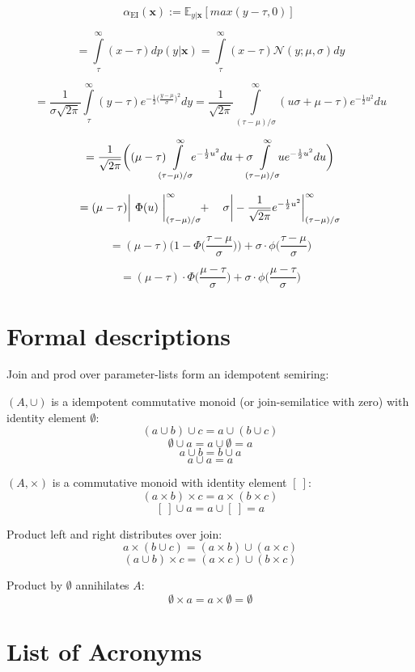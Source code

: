 \documentclass[english]{article}
\newcommand{\EI}{\operatorname{EI}}
\newcommand{\x}{\mathbf{x}}
\begin{document}
$$\alpha_{\EI}(\x) := \mathbb{E}_{y|\x}[max(y-\tau, 0)]\ $$

$$= \int\limits_{\tau}^{\infty}(x-\tau)dp(y|\x) = \int\limits_{\tau}^{\infty}(x-\tau)\mathcal{N}(y;\mu,\sigma)dy$$

$$ = \frac{1}{\sigma\sqrt{2\pi}} \int\limits_{\tau}^{\infty}(y-\tau)e^{-\frac{1}{2}\big(\frac{y-\mu}{\sigma}\big)^2}dy =
\frac{1}{\sqrt{2\pi}} \int\limits_{(\tau-\mu)/\sigma}^{\infty}(u\sigma+\mu-\tau)e^{-\frac{1}{2}u^2}du$$

$$=\frac{1}{\sqrt{2\pi}}\bigg((\mu-\tau) \mkern-12mu \int\limits_{(\tau-\mu)/\sigma}^{\infty} \mkern-10mu e^{-\frac{1}{2}u^2}du + \sigma \mkern-12mu \int\limits_{(\tau-\mu)/\sigma}^{\infty} \mkern-10mu u e^{-\frac{1}{2}u^2}du \bigg)$$

$$=(\mu-\tau)\bigg|\ \Phi(u)\ \bigg|_{(\tau-\mu)/\sigma}^{\infty} \mkern-6mu + \ \ \ \sigma\bigg|-\frac{1}{\sqrt{2\pi}}e^{-\frac{1}{2}u^2}\bigg|_{(\tau-\mu)/\sigma}^{\infty}$$

$$=(\mu-\tau)\bigg(1-\Phi\bigg(\frac{\tau-\mu}{\sigma}\bigg)\bigg) + \sigma \cdot \phi \bigg(\frac{\tau-\mu}{\sigma}\bigg)$$

$$ = (\mu - \tau) \cdot \Phi \bigg(\frac{\mu-\tau}{\sigma}\bigg) + \sigma \cdot \phi \bigg(\frac{\mu-\tau}{\sigma}\bigg)$$


\section{Formal descriptions}
Join and prod over parameter-lists form an idempotent semiring:

$(A, \cup)$ is a idempotent commutative monoid (or join-semilatice with zero) with identity element $\emptyset$:
$$(a \cup b) \cup c = a \cup (b \cup c)$$
$$\emptyset \cup a = a \cup \emptyset = a$$
$$a \cup b = b \cup a$$
$$a \cup a = a$$

$(A, \times)$ is a commutative monoid with identity element $[\ ]$:
$$(a \times b) \times c = a \times (b \times c)$$
$$[\ ] \cup a = a \cup [\ ] = a$$

Product left and right distributes over join:
$$a\times(b \cup c) = (a\times b) \cup (a\times c)$$
$$(a \cup b)\times c = (a\times c) \cup (b\times c)$$

Product by $\emptyset$ annihilates $A$:
$$\emptyset \times a = a \times \emptyset = \emptyset$$


\section*{List of Acronyms}
\begin{acronym}
\end{acronym}


\printbibliography
\end{document}
